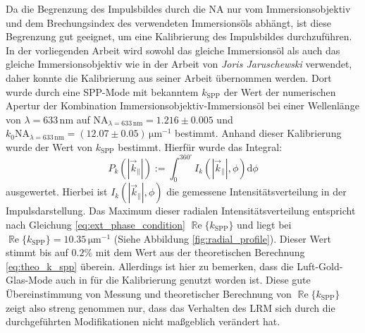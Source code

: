 \documentclass[titlepage,  ngerman]{article}
\renewcommand{\Re}{\operatorname{\mathbb{R}e}}
\begin{document}
	Da die Begrenzung des Impulsbildes durch die NA nur vom Immersionsobjektiv und dem Brechungsindex des verwendeten Immersionsöls abhängt, ist diese Begrenzung gut geeignet, um eine Kalibrierung des Impulsbildes durchzuführen. In der vorliegenden Arbeit wird sowohl das gleiche Immersionsöl als auch das gleiche Immersionsobjektiv wie in der Arbeit \cite{Jaruschewski.2020} von \textit{Joris Jaruschewski} verwendet, daher konnte die Kalibrierung aus seiner Arbeit übernommen werden. Dort wurde durch eine SPP-Mode mit bekanntem $k_{\mathrm{SPP}}$ der Wert der numerischen Apertur der Kombination Immersionsobjektiv-Immersionsöl bei einer Wellenlänge von $\lambda=633\,\mathrm{nm}$ auf $\mathrm{NA}_{\lambda = 633 \,\mathrm{nm}} = 1.216 \pm 0.005$  und $k_0\mathrm{NA}_{\lambda = 633 \, \mathrm{nm}} = (12.07 \pm 0.05)\,\mathrm{\mu m}^{-1}$ bestimmt. Anhand dieser Kalibrierung wurde der Wert von $k_{\mathrm{SPP}}$ bestimmt. Hierfür wurde das Integral:
	\begin{equation}
		P_k\left(|\vec{k}_{\parallel}|\right) := \int_{0}^{360^\circ} I_k\left(|\vec{k}_{\parallel}|, \phi\right)\mathrm{d}\phi
	\end{equation}	 
	ausgewertet. Hierbei ist $I_k(|\vec{k}_{\parallel}|, \phi)$ die gemessene Intensitätsverteilung in der Impulsdarstellung. Das Maximum dieser radialen Intensitätsverteilung entspricht nach Gleichung \eqref{eq:ext_phase_condition} $\Re\{k_{\mathrm{SPP}}\}$ und liegt bei $\Re\{k_{\mathrm{SPP}}\}= 10.35\,\mathrm{\mu m}^{-1}$ (Siehe Abbildung \ref{fig:radial_profile}). Dieser Wert stimmt bis auf $0.2\%$ mit dem Wert aus der theoretischen Berechnung \eqref{eq:theo_k_spp} überein. Allerdings ist hier zu bemerken, dass die Luft-Gold-Glas-Mode auch in \cite{Jaruschewski.2020} für die Kalibrierung genutzt worden ist. Diese gute Übereinstimmung von Messung und theoretischer Berechnung von $\Re\{k_\mathrm{SPP}\}$ zeigt also streng genommen nur, dass das Verhalten des LRM sich durch die durchgeführten Modifikationen nicht maßgeblich verändert hat.
\end{document}
